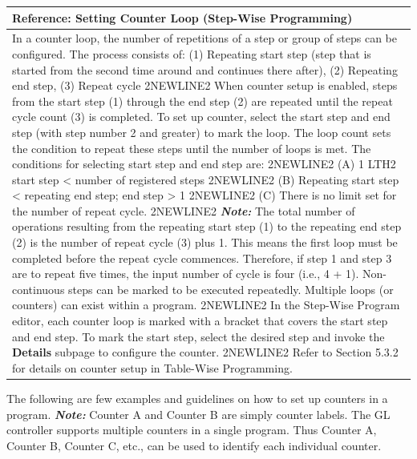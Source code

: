\begin{longtable}[]{@{}l@{}}
\toprule
\begin{minipage}[b]{0.97\columnwidth}\raggedright
\textbf{Reference}: Setting Counter Loop (Step-Wise Programming)\strut
\end{minipage}\tabularnewline
\midrule
\endhead
\begin{minipage}[t]{0.97\columnwidth}\raggedright
In a counter loop, the number of repetitions of a step or group of steps
can be configured. The process consists of: (1) Repeating start step
(step that is started from the second time around and continues there
after), (2) Repeating end step, (3) Repeat cycle 2NEWLINE2 When counter
setup is enabled, steps from the start step (1) through the end step (2)
are repeated until the repeat cycle count (3) is completed. To set up
counter, select the start step and end step (with step number 2 and
greater) to mark the loop. The loop count sets the condition to repeat
these steps until the number of loops is met. The conditions for
selecting start step and end step are: 2NEWLINE2 (A) 1 LTH2 start step
\textless{} number of registered steps 2NEWLINE2 (B) Repeating start
step \textless{} repeating end step; end step \textgreater{} 1 2NEWLINE2
(C) There is no limit set for the number of repeat cycle. 2NEWLINE2
\textbf{\emph{Note:}} The total number of operations resulting from the
repeating start step (1) to the repeating end step (2) is the number of
repeat cycle (3) plus 1. This means the first loop must be completed
before the repeat cycle commences. Therefore, if step 1 and step 3 are
to repeat five times, the input number of cycle is four (i.e., 4 + 1).
Non-continuous steps can be marked to be executed repeatedly. Multiple
loops (or counters) can exist within a program. 2NEWLINE2 In the
Step-Wise Program editor, each counter loop is marked with a bracket
that covers the start step and end step. To mark the start step, select
the desired step and invoke the \textbf{Details} subpage to configure
the counter. 2NEWLINE2 Refer to Section 5.3.2 for details on counter
setup in Table-Wise Programming.\strut
\end{minipage}\tabularnewline
\bottomrule
\end{longtable}

The following are few examples and guidelines on how to set up counters
in a program. \textbf{\emph{Note:}} Counter A and Counter B are simply
counter labels. The GL controller supports multiple counters in a single
program. Thus Counter A, Counter B, Counter C, etc., can be used to
identify each individual counter.


